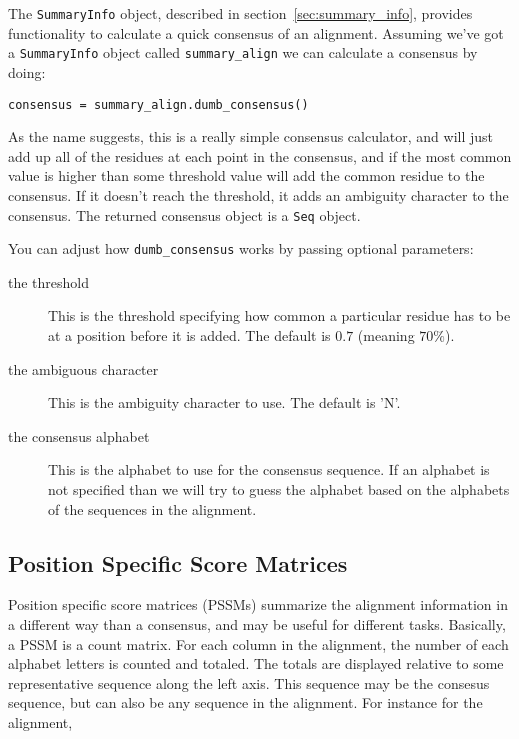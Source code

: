 The \verb|SummaryInfo| object, described in section~\ref{sec:summary_info}, provides functionality to calculate a quick consensus of an alignment. Assuming we've got a \verb|SummaryInfo| object called \verb|summary_align| we can calculate a consensus by doing:

\begin{verbatim}
consensus = summary_align.dumb_consensus()
\end{verbatim}

As the name suggests, this is a really simple consensus calculator, and will just add up all of the residues at each point in the consensus, and if the most common value is higher than some threshold value will add the common residue to the consensus. If it doesn't reach the threshold, it adds an ambiguity character to the consensus. The returned consensus object is a \verb|Seq| object.

You can adjust how \verb|dumb_consensus| works by passing optional parameters:

\begin{description}
\item[the threshold] This is the threshold specifying how common a particular residue has to be at a position before it is added. The default is $0.7$ (meaning $70\%$).

\item[the ambiguous character] This is the ambiguity character to use. The default is 'N'.

\item[the consensus alphabet] This is the alphabet to use for the consensus sequence. If an alphabet is not specified than we will try to guess the alphabet based on the alphabets of the sequences in the alignment.
\end{description}

\subsection{Position Specific Score Matrices}
\label{sec:pssm}

Position specific score matrices (PSSMs) summarize the alignment information in a different way than a consensus, and may be useful for different tasks. Basically, a PSSM is a count matrix. For each column in the alignment, the number of each alphabet letters is counted and totaled. The totals are displayed relative to some representative sequence along the left axis. This sequence may be the consesus sequence, but can also be any sequence in the alignment. For instance for the alignment,

